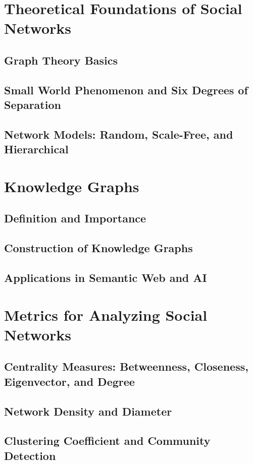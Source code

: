 \documentclass[12pt]{book} %
\begin{document}
\section{Theoretical Foundations of Social Networks}
\subsection{Graph Theory Basics}
\subsection{Small World Phenomenon and Six Degrees of Separation}
\subsection{Network Models: Random, Scale-Free, and Hierarchical}

\section{Knowledge Graphs}
\subsection{Definition and Importance}
\subsection{Construction of Knowledge Graphs}
\subsection{Applications in Semantic Web and AI}

\section{Metrics for Analyzing Social Networks}
\subsection{Centrality Measures: Betweenness, Closeness, Eigenvector, and Degree}
\subsection{Network Density and Diameter}
\subsection{Clustering Coefficient and Community Detection}
\end{document}
